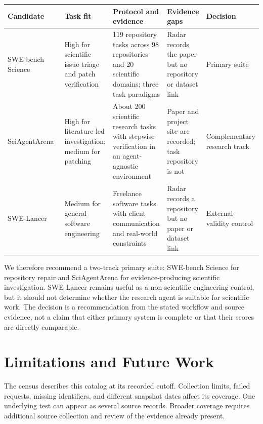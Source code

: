 \documentclass[11pt]{article}
\renewcommand{\arraystretch}{1.15}
\begin{document}
\begin{center}
\footnotesize
\setlength{\tabcolsep}{3pt}
\renewcommand{\arraystretch}{1.25}
\begin{tabularx}{0.99\textwidth}{L{2.5cm}L{2.0cm}L{3.0cm}L{2.0cm}L{2.0cm}}
\toprule
\textbf{Candidate} & \textbf{Task fit} & \textbf{Protocol and evidence} & \textbf{Evidence gaps} & \textbf{Decision} \\
\midrule
SWE-bench Science~\citep{openmoss2026swebenchscience} & High for scientific issue triage and patch verification & 119 repository tasks across 98 repositories and 20 scientific domains; three task paradigms & Radar records the paper but no repository or dataset link & Primary suite \\
SciAgentArena~\citep{sciagentarena2026} & High for literature-led investigation; medium for patching & About 200 scientific research tasks with stepwise verification in an agent-agnostic environment & Paper and project site are recorded; task repository is not & Complementary research track \\
SWE-Lancer~\citep{nair2025swelancer} & Medium for general software engineering & Freelance software tasks with client communication and real-world constraints & Radar records a repository but no paper or dataset link & External-validity control \\
\bottomrule
\end{tabularx}
\label{tab:industry-agent-suite}
\end{center}

We therefore recommend a two-track primary suite: SWE-bench Science for repository repair and SciAgentArena for evidence-producing scientific investigation. SWE-Lancer remains useful as a non-scientific engineering control, but it should not determine whether the research agent is suitable for scientific work. The decision is a recommendation from the stated workflow and source evidence, not a claim that either primary system is complete or that their scores are directly comparable.

\section{Limitations and Future Work}
\label{sec:caveat-future-work}

The census describes this catalog at its recorded cutoff. Collection limits, failed requests, missing identifiers, and different snapshot dates affect its coverage. One underlying test can appear as several source records. Broader coverage requires additional source collection and review of the evidence already present.
\end{document}
